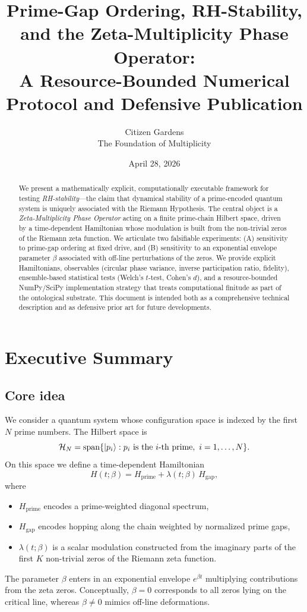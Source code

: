 \documentclass[11pt]{article}
\title{Prime-Gap Ordering, RH-Stability, \\ and the Zeta-Multiplicity Phase Operator:\\
A Resource-Bounded Numerical Protocol and Defensive Publication}
\author{Citizen Gardens \\ The Foundation of Multiplicity}
\date{April 28, 2026}
\begin{document}
\maketitle

\begin{abstract}
We present a mathematically explicit, computationally executable framework for testing \emph{RH-stability}---the claim that dynamical stability of a prime-encoded quantum system is uniquely associated with the Riemann Hypothesis. The central object is a \emph{Zeta-Multiplicity Phase Operator} acting on a finite prime-chain Hilbert space, driven by a time-dependent Hamiltonian whose modulation is built from the non-trivial zeros of the Riemann zeta function. We articulate two falsifiable experiments: (A) sensitivity to prime-gap ordering at fixed drive, and (B) sensitivity to an exponential envelope parameter $\beta$ associated with off-line perturbations of the zeros. We provide explicit Hamiltonians, observables (circular phase variance, inverse participation ratio, fidelity), ensemble-based statistical tests (Welch's $t$-test, Cohen's $d$), and a resource-bounded NumPy/SciPy implementation strategy that treats computational finitude as part of the ontological substrate. This document is intended both as a comprehensive technical description and as defensive prior art for future developments.
\end{abstract}
\newpage
\tableofcontents

\section{Executive Summary}

\subsection{Core idea}

We consider a quantum system whose configuration space is indexed by the first $N$ prime numbers. The Hilbert space is
\[
\mathcal{H}_N = \mathrm{span}\{ \ket{p_i} : p_i \text{ is the $i$-th prime},\ i=1,\dots,N\}.
\]
On this space we define a time-dependent Hamiltonian
\[
H(t;\beta) = H_{\mathrm{prime}} + \lambda(t;\beta)\,H_{\mathrm{gap}},
\]
where
\begin{itemize}
  \item $H_{\mathrm{prime}}$ encodes a prime-weighted diagonal spectrum,
  \item $H_{\mathrm{gap}}$ encodes hopping along the chain weighted by normalized prime gaps,
  \item $\lambda(t;\beta)$ is a scalar modulation constructed from the imaginary parts of the first $K$ non-trivial zeros of the Riemann zeta function.
\end{itemize}
The parameter $\beta$ enters in an exponential envelope $e^{\beta t}$ multiplying contributions from the zeta zeros. Conceptually, $\beta=0$ corresponds to all zeros lying on the critical line, whereas $\beta\neq 0$ mimics off-line deformations. 
\end{document}
